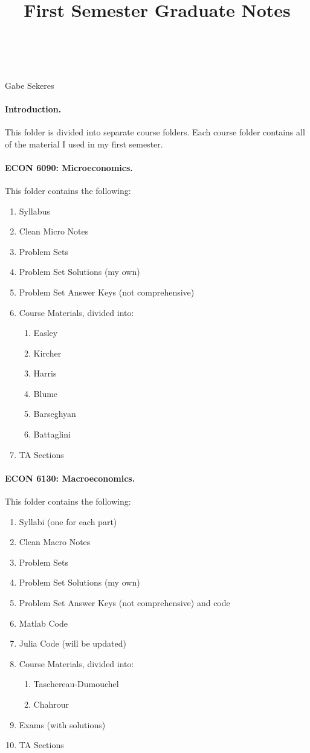 \documentclass[12pt]{article}
\title{First Semester Graduate Notes}
\makeatletter
\renewcommand{\maketitle}{
    \begin{tcolorbox}[colback=purple!5!white,colframe=black]
        \begin{center}
            \textbf{\@course} \\[0.25em]
            {\Large\textit{\@entitle}} \\[0.5em]
            Gabe Sekeres \\[0.5em]
            \@term
        \end{center}
    \end{tcolorbox}
    \vspace{1em}
}
\makeatother
\begin{document}
	\maketitle
	
	\paragraph{Introduction.} This folder is divided into separate course folders. Each course folder contains all of the material I used in my first semester.
	
	\paragraph{ECON 6090: Microeconomics.} This folder contains the following:
	\begin{enumerate}
		\item Syllabus
		\item Clean Micro Notes
		\item Problem Sets
		\item Problem Set Solutions (my own)
		\item Problem Set Answer Keys (not comprehensive)
		\item Course Materials, divided into:
		\begin{enumerate}
			\item Easley
			\item Kircher
			\item Harris
			\item Blume
			\item Barseghyan
			\item Battaglini
		\end{enumerate}
		\item TA Sections
	\end{enumerate}
	
	\paragraph{ECON 6130: Macroeconomics.} This folder contains the following:
	\begin{enumerate}
		\item Syllabi (one for each part)
		\item Clean Macro Notes
		\item Problem Sets
		\item Problem Set Solutions (my own)
		\item Problem Set Answer Keys (not comprehensive) and code
		\item Matlab Code
		\item Julia Code (will be updated)
		\item Course Materials, divided into:
		\begin{enumerate}
			\item Taschereau-Dumouchel
			\item Chahrour
		\end{enumerate}
		\item Exams (with solutions)
		\item TA Sections
	\end{enumerate}
	
\end{document}

